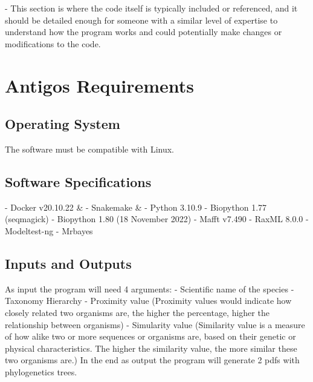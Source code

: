 \documentclass[12pt]{article}
\begin{document}
- This section is where the code itself is typically included or referenced, and it should be detailed enough for someone with a similar level of expertise to understand how the program works and could potentially make changes or modifications to the code.

\section{Antigos Requirements}\label{sec:desenvolvimentos}
\subsection{Operating System}
The software must be compatible with Linux.
\subsection{Software Specifications}
- Docker v20.10.22 \& \newline
- Snakemake \& \newline
- Python 3.10.9\newline
- Biopython 1.77 (seqmagick)\newline 
- Biopython 1.80 (18 November 2022)\newline
- Mafft v7.490 \newline
- RaxML 8.0.0 \newline
- Modeltest-ng \newline
- Mrbayes\newline
\newpage

\subsection{Inputs and Outputs}
As input the program will need 4 arguments: - Scientific name of the species - Taxonomy Hierarchy - Proximity value (Proximity values would indicate how closely related two organisms are, the higher the percentage, higher the relationship between organisms) - Simularity value (Similarity value is a measure of how alike two or more sequences or organisms are, based on their genetic or physical characteristics. The higher the similarity value, the more similar these two organisms are.)\newline
In the end as output the program will generate 2 pdfs with phylogenetics trees.
    
\end{document}
